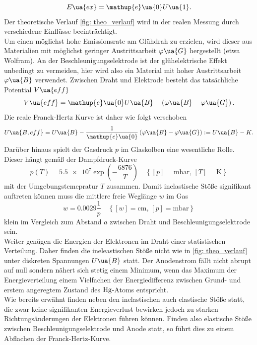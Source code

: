 \begin{equation}
  \label{eq: anregungsenergie}
  E\ua{ex} = \mathup{e}\ua{0}U\ua{1}.
\end{equation}
Der theoretische
Verlauf \ref{fig: theo_verlauf} wird in der realen Messung durch verschiedene Einflüsse beeinträchtigt. \\
Um einen möglichst hohe Emissionsrate am Glühdrah zu erzielen, wird dieser aus Materialien mit möglichst geringer Austrittsarbeit $\varphi\ua{G}$
hergestellt (etwa Wolfram). An der Beschleunigungselektrode ist der glühelektrische Effekt unbedingt zu vermeiden, hier wird also
ein Material mit hoher Austrittsarbeit $\varphi\ua{B}$ verwendet. Zwischen Draht und Elektrode besteht das tatsächliche
Potential $V\ua{eff}$
\begin{equation}
  V\ua{eff} = \mathup{e}\ua{0} U\ua{B} - \left(\varphi\ua{B} - \varphi\ua{G}  \right).
\end{equation}
Die reale Franck-Hertz Kurve ist daher wie folgt verschoben
\begin{equation}
  \label{eq: effektivspannung}
  U\ua{B, eff} = U\ua{B} - \frac{1}{\mathup{e}\ua{0}}\left(\varphi\ua{B} - \varphi\ua{G}  \right) := U\ua{B}  - K.
\end{equation}
Darüber hinaus spielt der Gasdruck $p$ im Glaskolben eine wesentliche Rolle. Dieser hängt gemäß der Dampfdruck-Kurve
\begin{equation}
  \label{eq: dampfdruck}
  p(T) = \num{5.5e7}\exp \left( -\frac{6876}{T} \right) \quad \left\{[p] = \si{\milli\bar}, \, [T] = \si{\kelvin}\right\}
\end{equation}
mit der Umgebungstemepratur $T$ zusammen. Damit inelastische Stöße signifikant auftreten können muss die mittlere
freie Weglänge $w$ im Gas
\begin{equation}
  \label{eq: weglaenge}
  w = 0.0029 \frac{1}{p} \quad \left\{[w] = \si{\centi\meter}, \, [p] = \si{\milli\bar} \right\}
\end{equation}
klein im Vergleich zum Abstand $a$ zwischen Draht und Beschleunigungselektrode sein. \\
Weiter genügen die Energien der Elektronen im Draht einer statistischen Verteilung. Daher finden die ineleastischen
Stöße nicht wie in \ref{fig: theo_verlauf} unter diskreten Spannungen $U\ua{B}$ statt. Der Anodenstrom fällt nicht abrupt
auf null sondern nähert sich stetig einem Minimum, wenn das Maximum der Energieverteilung einem Vielfachen der Energiedifferenz
zwischen Grund- und erstem angeregtem Zustand des $\ce{Hg}$-Atoms entspricht. \\
Wie bereits erwähnt finden neben den inelastischen auch elastische Stöße statt, die zwar keine signifikanten Energieverlust
bewirken jedoch zu starken Richtungsänderungen der Elektronen führen können. Finden also elastische Stöße zwischen Beschleunigungselektrode
und Anode statt, so führt dies zu einem Abflachen der Franck-Hertz-Kurve.
